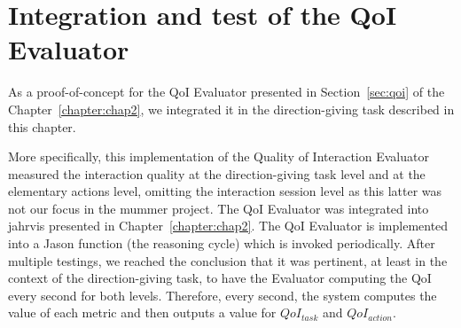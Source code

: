 \documentclass[a4paper,11pt,twoside]{StyleThese}
\begin{document}
\section{Integration and test of the QoI Evaluator}\label{sec:qoi_integration}
As a proof-of-concept for the QoI Evaluator presented in Section~\ref{sec:qoi} of the Chapter~\ref{chapter:chap2}, we integrated it in the direction-giving task described in this chapter.


More specifically, this implementation of the Quality of Interaction Evaluator measured the interaction quality at the direction-giving task level and at the elementary actions level, omitting the interaction session level as this latter was not our focus in the \acrshort{mummer} project. The QoI Evaluator was integrated into \acrshort{jahrvis} presented in Chapter~\ref{chapter:chap2}. The QoI Evaluator is implemented into a Jason function (the reasoning cycle) which is invoked periodically. After multiple testings, we reached the conclusion that it was pertinent, at least in the context of the direction-giving task, to have the Evaluator computing the QoI every second for both levels. Therefore, every second, the system computes the value of each metric and then outputs a value for $QoI_{task}$ and $QoI_{action}$. 
\end{document}

